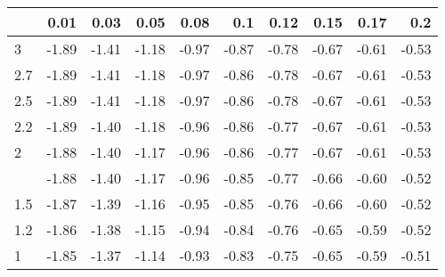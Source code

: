 
\begin{tabular}{lrrrrrrrrr}
\toprule
  & 0.01 & 0.03 & 0.05 & 0.08 & 0.1 & 0.12 & 0.15 & 0.17 & 0.2\\
\midrule
3 & -1.89 & -1.41 & -1.18 & -0.97 & -0.87 & -0.78 & -0.67 & -0.61 & -0.53\\
2.7 & -1.89 & -1.41 & -1.18 & -0.97 & -0.86 & -0.78 & -0.67 & -0.61 & -0.53\\
2.5 & -1.89 & -1.41 & -1.18 & -0.97 & -0.86 & -0.78 & -0.67 & -0.61 & -0.53\\
2.2 & -1.89 & -1.40 & -1.18 & -0.96 & -0.86 & -0.77 & -0.67 & -0.61 & -0.53\\
2 & -1.88 & -1.40 & -1.17 & -0.96 & -0.86 & -0.77 & -0.67 & -0.61 & -0.53\\
\addlinespace
1.7 & -1.88 & -1.40 & -1.17 & -0.96 & -0.85 & -0.77 & -0.66 & -0.60 & -0.52\\
1.5 & -1.87 & -1.39 & -1.16 & -0.95 & -0.85 & -0.76 & -0.66 & -0.60 & -0.52\\
1.2 & -1.86 & -1.38 & -1.15 & -0.94 & -0.84 & -0.76 & -0.65 & -0.59 & -0.52\\
1 & -1.85 & -1.37 & -1.14 & -0.93 & -0.83 & -0.75 & -0.65 & -0.59 & -0.51\\
\bottomrule
\end{tabular}
